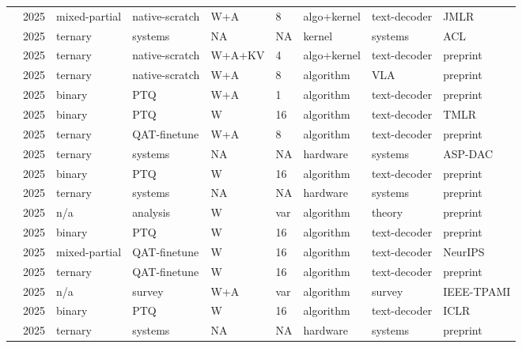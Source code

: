 \documentclass[11pt]{article}
\begin{document}
\begin{landscape}
\begin{longtable}{p{3.2cm} p{1cm} p{1.9cm} p{2.2cm} p{2.2cm} p{1.3cm} p{2.2cm} p{2.1cm} p{2.5cm}}
\citet{Wang2025-BitNetJMLR} & 2025 & mixed-partial & native-scratch & W+\allowbreak{}A & 8 & algo+\allowbreak{}kernel & text-decoder & JMLR \\
\citet{Wang2025-BitNetCPP} & 2025 & ternary & systems & NA & NA & kernel & systems & ACL \\
\citet{Wang2025-BitNetV2} & 2025 & ternary & native-scratch & W+\allowbreak{}A+\allowbreak{}KV & 4 & algo+\allowbreak{}kernel & text-decoder & preprint \\
\citet{Wang2025-BitVLA} & 2025 & ternary & native-scratch & W+\allowbreak{}A & 8 & algorithm & VLA & preprint \\
\citet{Anon2025-BinaryWA-PTQ} & 2025 & binary & PTQ & W+\allowbreak{}A & 1 & algorithm & text-decoder & preprint \\
\citet{Anon2025-DoubleBinaryFactorization} & 2025 & binary & PTQ & W & 16 & algorithm & text-decoder & TMLR \\
\citet{Wu2025-BitNetDistillation} & 2025 & ternary & QAT-finetune & W+\allowbreak{}A & 8 & algorithm & text-decoder & preprint \\
\citet{Zhang2025-BitROM} & 2025 & ternary & systems & NA & NA & hardware & systems & ASP-DAC \\
\citet{Gu2025-BTCLLM} & 2025 & binary & PTQ & W & 16 & algorithm & text-decoder & preprint \\
\citet{Anon2025-CPUvsGPU} & 2025 & ternary & systems & NA & NA & hardware & systems & preprint \\
\citet{Anon2025-CompressionScalingLaws} & 2025 & n/\allowbreak{}a & analysis & W & var & algorithm & theory & preprint \\
\citet{Chen2025-HBLLM} & 2025 & binary & PTQ & W & 16 & algorithm & text-decoder & preprint \\
\citet{Anon2025-STE-ZerothOrder} & 2025 & mixed-partial & QAT-finetune & W & 16 & algorithm & text-decoder & Neur\allowbreak{}IPS \\
\citet{Chen2025-LoTAQAF} & 2025 & ternary & QAT-finetune & W & 16 & algorithm & text-decoder & preprint \\
\citet{Hao2025-LowPrecTrainingSurvey} & 2025 & n/\allowbreak{}a & survey & W+\allowbreak{}A & var & algorithm & survey & IEEE-TPAMI \\
\citet{Anon2025-MultiBoolean} & 2025 & binary & PTQ & W & 16 & algorithm & text-decoder & ICLR \\
\citet{Malekar2025-PIMLLM} & 2025 & ternary & systems & NA & NA & hardware & systems & preprint \\

\end{longtable}
\end{landscape}
\end{document}
